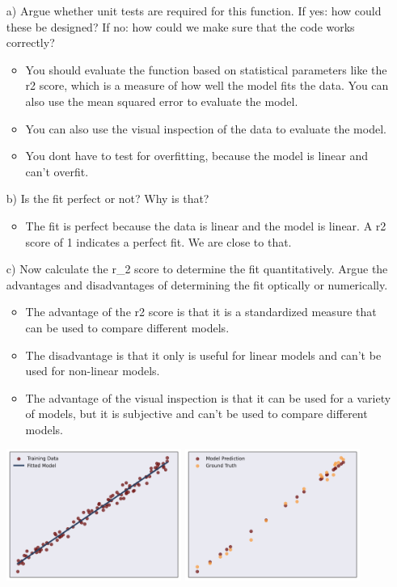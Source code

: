 \documentclass{article}
\begin{document}
\begin{enumerate}

\item[a)] Argue whether unit tests are required for this function. If yes: how could these be designed? If no: how could we make sure that the code works correctly?
\begin{itemize}
	\item You should evaluate the function based on statistical parameters like the r2 score, which is a measure of how well the model fits the data. You can also use the mean squared error to evaluate the model.
	\item You can also use the visual inspection of the data to evaluate the model.
	\item You dont have to test for overfitting, because the model is linear and can't overfit.
\end{itemize}

\item[b)] Is the fit perfect or not? Why is that?
\begin{itemize}
	\item The fit is perfect because the data is linear and the model is linear. A r2 score of 1 indicates a perfect fit. We are close to that.
\end{itemize}

\item[c)] Now calculate the r\_2 score to determine the fit quantitatively. Argue the advantages and disadvantages of determining the fit optically or numerically.
\begin{itemize}
	\item The advantage of the r2 score is that it is a standardized measure that can be used to compare different models.
	\item The disadvantage is that it only is useful for linear models and can't be used for non-linear models.
	\item The advantage of the visual inspection is that it can be used for a variety of models, but it is subjective and can't be used to compare different models.
\end{itemize}

\includegraphics[width=0.45\textwidth]{source_code/goodfit_linear_model.png}
\includegraphics[width=0.45\textwidth]{source_code/goodfit_linear_testdata.png}


\end{enumerate}
\end{document}
